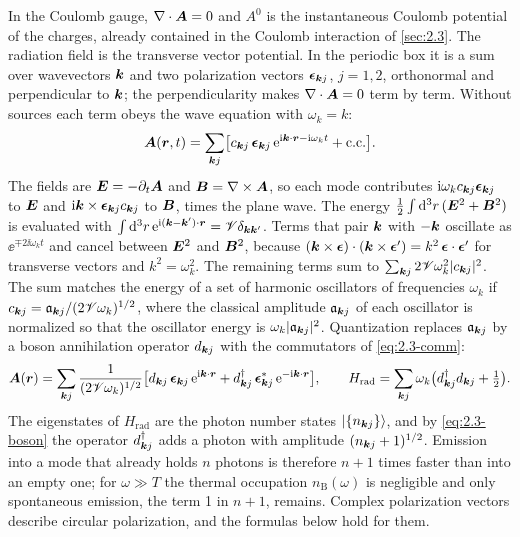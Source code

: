 In the Coulomb gauge, $\nabla\cdot\bm{A} = 0$ and $A^0$ is the instantaneous Coulomb potential of the charges, already contained in the Coulomb interaction of \cref{sec:2.3}. The radiation field is the transverse vector potential. In the periodic box it is a sum over wavevectors $\bm{k}$ and two polarization vectors $\boldsymbol{\epsilon}_{\bm{k}j}$, $j = 1, 2$, orthonormal and perpendicular to $\bm{k}$; the perpendicularity makes $\nabla\cdot\bm{A} = 0$ term by term. Without sources each term obeys the wave equation with $\omega_k = k$:
\begin{equation*}
  \bm{A}(\bm{r}, t) = \sum_{\bm{k}j}\bigl[c_{\bm{k}j}\,\boldsymbol{\epsilon}_{\bm{k}j}\,\mathrm{e}^{\mathrm{i}\bm{k}\cdot\bm{r} - \mathrm{i}\omega_kt} + \text{c.c.}\bigr] .
\end{equation*}
The fields are $\bm{E} = -\partial_t\bm{A}$ and $\bm{B} = \nabla\times\bm{A}$, so each mode contributes $\mathrm{i}\omega_k c_{\bm{k}j}\boldsymbol{\epsilon}_{\bm{k}j}$ to $\bm{E}$ and $\mathrm{i}\bm{k}\times\boldsymbol{\epsilon}_{\bm{k}j}c_{\bm{k}j}$ to $\bm{B}$, times the plane wave. The energy $\tfrac12\int\mathrm{d}^3r\,(\bm{E}^2 + \bm{B}^2)$ is evaluated with $\int\mathrm{d}^3r\,\mathrm{e}^{\mathrm{i}(\bm{k} - \bm{k}')\cdot\bm{r}} = \mathscr{V}\delta_{\bm{k}\bm{k}'}$. Terms that pair $\bm{k}$ with $-\bm{k}$ oscillate as $\ee^{\mp2\ii\omega_kt}$ and cancel between $\bm{E}^2$ and $\bm{B}^2$, because $(\bm{k}\times\boldsymbol{\epsilon})\cdot(\bm{k}\times\boldsymbol{\epsilon}') = k^2\,\boldsymbol{\epsilon}\cdot\boldsymbol{\epsilon}'$ for transverse vectors and $k^2 = \omega_k^2$. The remaining terms sum to $\sum_{\bm{k}j}2\mathscr{V}\omega_k^2|c_{\bm{k}j}|^2$. The sum matches the energy of a set of harmonic oscillators of frequencies $\omega_k$ if $c_{\bm{k}j} = \mathfrak{a}_{\bm{k}j}/(2\mathscr{V}\omega_k)^{1/2}$, where the classical amplitude $\mathfrak{a}_{\bm{k}j}$ of each oscillator is normalized so that the oscillator energy is $\omega_k|\mathfrak{a}_{\bm{k}j}|^2$. Quantization replaces $\mathfrak{a}_{\bm{k}j}$ by a boson annihilation operator $d_{\bm{k}j}$ with the commutators of \cref{eq:2.3-comm}:
\begin{equation}
  \bm{A}(\bm{r}) = \sum_{\bm{k}j}\frac{1}{(2\mathscr{V}\omega_k)^{1/2}}\bigl[d_{\bm{k}j}\,\boldsymbol{\epsilon}_{\bm{k}j}\,\mathrm{e}^{\mathrm{i}\bm{k}\cdot\bm{r}} + d^\dagger_{\bm{k}j}\,\boldsymbol{\epsilon}^*_{\bm{k}j}\,\mathrm{e}^{-\mathrm{i}\bm{k}\cdot\bm{r}}\bigr], \qquad
  H_{\mathrm{rad}} = \sum_{\bm{k}j}\omega_k\bigl(d^\dagger_{\bm{k}j}d_{\bm{k}j} + \tfrac12\bigr) .
  \label{eq:C.16-A}
\end{equation}
The eigenstates of $H_{\mathrm{rad}}$ are the photon number states $|\{n_{\bm{k}j}\}\rangle$, and by \cref{eq:2.3-boson} the operator $d^\dagger_{\bm{k}j}$ adds a photon with amplitude $(n_{\bm{k}j} + 1)^{1/2}$. Emission into a mode that already holds $n$ photons is therefore $n + 1$ times faster than into an empty one; for $\omega \gg T$ the thermal occupation $n_{\mathrm{B}}(\omega)$ is negligible and only spontaneous emission, the term 1 in $n + 1$, remains. Complex polarization vectors describe circular polarization, and the formulas below hold for them.

